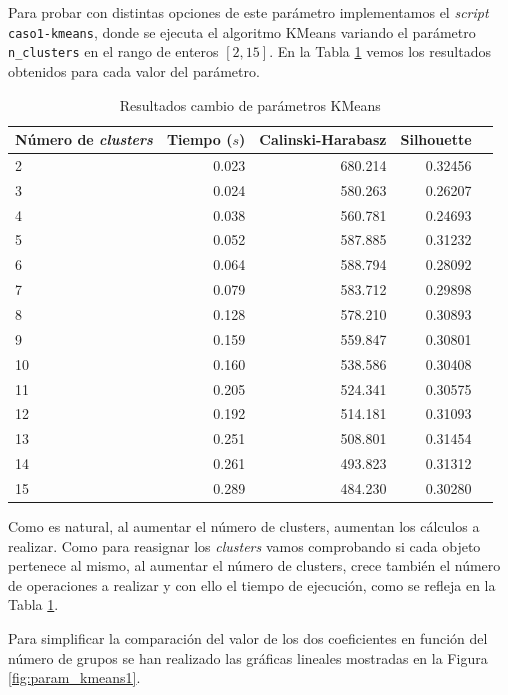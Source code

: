 \documentclass[a4paper, 20pt]{article}
\begin{document}
Para probar con distintas opciones de este parámetro implementamos el \textit{script} \texttt{caso1-kmeans}, donde se ejecuta el algoritmo KMeans variando el parámetro \texttt{n\_clusters} en el rango de enteros $[2,15]$. En la Tabla \ref{tab:param_kmeans1} vemos los resultados obtenidos para cada valor del parámetro.

\begin{table}[H]
\centering
\caption{Resultados cambio de parámetros KMeans}
\label{tab:param_kmeans1}
\begin{tabular}{lrrrr}
\toprule
Número de \textit{clusters} & Tiempo ($s$) & Calinski-Harabasz & Silhouette &\\
\midrule
2 & 0.023 & 680.214 & 0.32456 \\
3 & 0.024 & 580.263 & 0.26207 \\
4 & 0.038 & 560.781 & 0.24693 \\
5 & 0.052 & 587.885 & 0.31232 \\
6 & 0.064 & 588.794 & 0.28092 \\
7 & 0.079 & 583.712 & 0.29898 \\
8 & 0.128 & 578.210 & 0.30893 \\
9 & 0.159 & 559.847 & 0.30801 \\
10 & 0.160 & 538.586 & 0.30408 \\
11 & 0.205 & 524.341 & 0.30575 \\
12 & 0.192 & 514.181 & 0.31093 \\
13 & 0.251 & 508.801 & 0.31454 \\
14 & 0.261 & 493.823 & 0.31312 \\
15 & 0.289 & 484.230 & 0.30280 \\
\bottomrule
\end{tabular}
\end{table}

Como es natural, al aumentar el número de clusters, aumentan los cálculos a realizar. Como para reasignar los \textit{clusters} vamos comprobando si cada objeto pertenece al mismo, al aumentar el número de clusters, crece también el número de operaciones a realizar y con ello el tiempo de ejecución, como se refleja en la Tabla \ref{tab:param_kmeans1}.

Para simplificar la comparación del valor de los dos coeficientes en función del número de grupos se han realizado las gráficas lineales mostradas en la Figura \ref{fig:param_kmeans1}.
\end{document}
